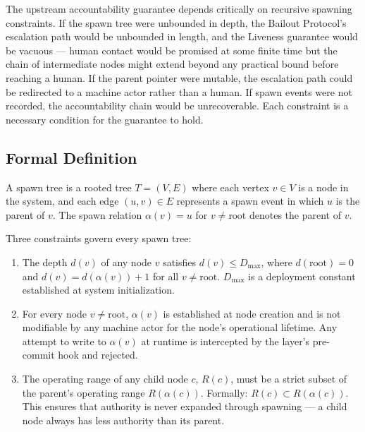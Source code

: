The upstream accountability guarantee depends critically on recursive spawning constraints. If the spawn tree were unbounded in depth, the Bailout Protocol's escalation path would be unbounded in length, and the Liveness guarantee would be vacuous — human contact would be promised at some finite time but the chain of intermediate nodes might extend beyond any practical bound before reaching a human. If the parent pointer were mutable, the escalation path could be redirected to a machine actor rather than a human. If spawn events were not recorded, the accountability chain would be unrecoverable. Each constraint is a necessary condition for the guarantee to hold.

\subsection{Formal Definition}\label{sec:recursive-spawning-formal}

A \bxthree{} spawn tree is a rooted tree $T = (V, E)$ where each vertex $v \in V$ is a node in the \bxthree{} system, and each edge $(u, v) \in E$ represents a spawn event in which $u$ is the parent of $v$. The spawn relation $\alpha(v) = u$ for $v \neq \text{root}$ denotes the parent of $v$.

Three constraints govern every spawn tree:

\begin{enumerate}\itemsep=0pt
\item[\textbf{Hierarchy Finiteness.}] The depth $d(v)$ of any node $v$ satisfies $d(v) \leq D_{\max}$, where $d(\text{root}) = 0$ and $d(v) = d(\alpha(v)) + 1$ for all $v \neq \text{root}$. $D_{\max}$ is a deployment constant established at system initialization.

\item[\textbf{Parent-Pointer Immutability.}] For every node $v \neq \text{root}$, $\alpha(v)$ is established at node creation and is not modifiable by any machine actor for the node's operational lifetime. Any attempt to write to $\alpha(v)$ at runtime is intercepted by the \fact{} layer's pre-commit hook and rejected.

\item[\textbf{Delegation Scope Inheritance.}] The operating range of any child node $c$, $R(c)$, must be a strict subset of the parent's operating range $R(\alpha(c))$. Formally: $R(c) \subset R(\alpha(c))$. This ensures that authority is never expanded through spawning — a child node always has less authority than its parent.
\end{enumerate}

